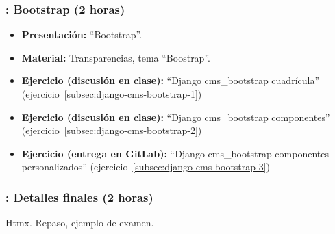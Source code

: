 \documentclass[a4paper,12pt]{article}
\begin{document}
\subsubsection{\juevesL: Bootstrap (2 horas)}
\label{cal:juevesL}

\begin{itemize}
\item \textbf{Presentación:} ``Bootstrap''.
 \item \textbf{Material:} Transparencias, tema ``Boostrap''.
   \item \textbf{Ejercicio (discusión en clase):} ``Django cms\_bootstrap cuadrícula'' (ejercicio~\ref{subsec:django-cms-bootstrap-1})
   \item \textbf{Ejercicio (discusión en clase):} ``Django cms\_bootstrap componentes'' (ejercicio~\ref{subsec:django-cms-bootstrap-2})
\item \textbf{Ejercicio (entrega en GitLab):} ``Django cms\_bootstrap componentes personalizados'' (ejercicio~\ref{subsec:django-cms-bootstrap-3})
\end{itemize}

\subsubsection{\juevesM: Detalles finales (2 horas)}
\label{cal:juevesM}

Htmx. Repaso, ejemplo de examen.





\end{document}
